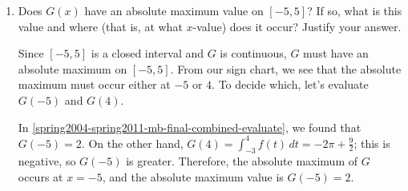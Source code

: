 \documentclass{article}
\begin{document}
\begin{enumerate}
{\begin{enumerate}[resume]
      \begin{solution}
        Since $[-5, 5]$ is a closed interval and $G$ is continuous, $G$ must
        have an absolute maximum on $[-5, 5]$.  From our sign chart, we see
        that the absolute maximum must occur either at $1$ or $5$.  To
        decide which, let's evaluate $G(1)$ and $G(5)$:
        \begin{align*}
          G(1) &= - 2 \pi \text{ from
            \ref{spring2004-spring2011-mb-final-combined-evaluate}} \\
          G(5) &= \int_{-3}^5 f(t)\,dt = - 2 \pi + 3
        \end{align*}
        The smaller of these two is $G(1)$, so $G$ has an absolute minimum
        at $\boxed{x = 1}$, and the absolute minimum value is
        $\boxed{-2\pi}$.
      \end{solution}

    \item
      \begin{problem}[\vfill\newpage]
        Does $G(x)$ have an absolute maximum value on $[-5, 5]$?  If so,
        what is this value and where (that is, at what $x$-value) does it
        occur?  Justify your answer.
      \end{problem}

      \begin{solution}      
        Since $[-5, 5]$ is a closed interval and $G$ is continuous, $G$ must
        have an absolute maximum on $[-5, 5]$.  From our sign chart, we see
        that the absolute maximum must occur either at $-5$ or $4$.  To
        decide which, let's evaluate $G(-5)$ and $G(4)$.

        In \ref{spring2004-spring2011-mb-final-combined-evaluate}, we found
        that $G(-5) = 2$.  On the other hand, $G(4) = \displaystyle
        \int_{-3}^4 f(t)\,dt = - 2 \pi + \frac{9}{2}$; this is negative,
        so $G(-5)$ is greater.  Therefore, the absolute maximum of $G$
        occurs at $\boxed{x = -5}$, and the absolute maximum value is
        $G(-5) = \boxed{2}$.
      \end{solution}

    \end{enumerate}


}
\end{enumerate}
\end{document}

